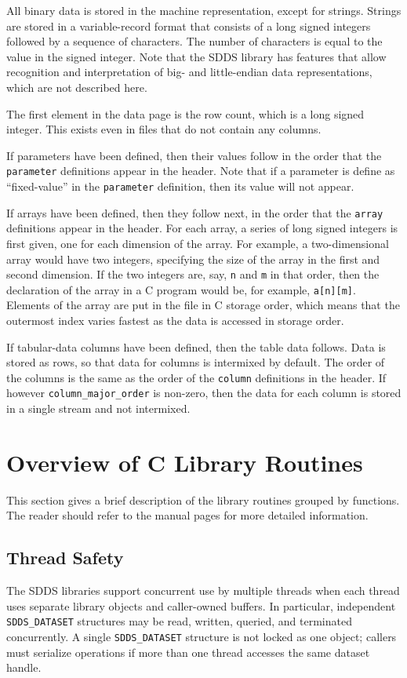 \documentclass[11pt]{article}
\begin{document}
All binary data is stored in the machine representation, except for
strings.  Strings are stored in a variable-record format that consists
of a long signed integers followed by a sequence of characters.  The number
of characters is equal to the value in the signed integer.  Note that
the SDDS library has features that allow recognition and interpretation
of big- and little-endian data representations, which are not described here.

The first element in the data page is the row count, which is a long
signed integer.  This exists even in files that do not contain any
columns.

If parameters have been defined, then their values follow in the order
that the {\tt parameter} definitions appear in the header.  Note that
if a parameter is define as ``fixed-value'' in the {\tt parameter}
definition, then its value will not appear.

If arrays have been defined, then they follow next, in the order that
the {\tt array} definitions appear in the header.  For each array, a
series of long signed integers is first given, one for each dimension
of the array.  For example, a two-dimensional array would have two
integers, specifying the size of the array in the first and second
dimension.  If the two integers are, say, {\tt n} and {\tt m} in that
order, then the declaration of the array in a C program would be, for
example, {\tt a[n][m]}.  Elements of the array are put in the file in
C storage order, which means that the outermost index varies fastest
as the data is accessed in storage order.

If tabular-data columns have been defined, then the table data follows.
Data is stored as rows, so that data for columns is intermixed by default.  The
order of the columns is the same as the order of the {\tt column} definitions
in the header. If however {\tt column\_major\_order} is non-zero, then the 
data for each column is stored in a single stream and not intermixed.

\section{Overview of C Library Routines}
This section gives a brief description of the library routines grouped by functions. The reader should refer to the manual pages for more detailed information. 
\subsection{Thread Safety}
The SDDS libraries support concurrent use by multiple threads when each thread
uses separate library objects and caller-owned buffers. In particular,
independent {\tt SDDS\_DATASET} structures may be read, written, queried, and
terminated concurrently. A single {\tt SDDS\_DATASET} structure is not locked as
one object; callers must serialize operations if more than one thread accesses
the same dataset handle.
\end{document}
